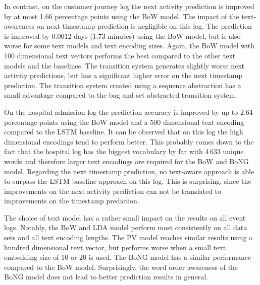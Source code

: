 In contrast, on the customer journey log the next activity prediction is improved by at most 1.66 percentage points using the BoW model.
The impact of the text-awareness on next timestamp prediction is negligible on this log.
The prediction is improved by 0.0012 days (1.73 minutes) using the BoW model, but is also worse for some text models and text encoding sizes.
Again, the BoW model with 100 dimensional text vectors performs the best compared to the other text models and the baselines.
The transition system generates slightly worse next activity predictions, but has a significant higher error on the next timestamp prediction.
The transition system created using a sequence abstraction has a small advantage compared to the bag and set abstracted transition system.

On the hospital admission log the prediction accuracy is improved by up to 2.64 percentage points using the BoW model and a 500 dimensional text encoding compared to the LSTM baseline.
It can be observed that on this log the high dimensional encodings tend to perform better.
This probably comes down to the fact that the hospital log has the biggest vocabulary by far with 4\,633 unique words and therefore larger text encodings are required for the BoW and BoNG model.
Regarding the next timestamp prediction, no text-aware approach is able to surpass the LSTM baseline approach on this log.
This is surprising, since the improvements on the next activity prediction can not be translated to improvements on the timestamp prediction.

The choice of text model has a rather small impact on the results on all event logs.
Notably, the BoW and LDA model perform most consistently on all data sets and all text encoding lengths.
The PV model reaches similar results using a hundred dimensional text vector, but performs worse when a small text embedding size of 10 or 20 is used.
The BoNG model has a similar performance compared to the BoW model.
Surprisingly, the word order awareness of the BoNG model does not lead to better prediction results in general.






